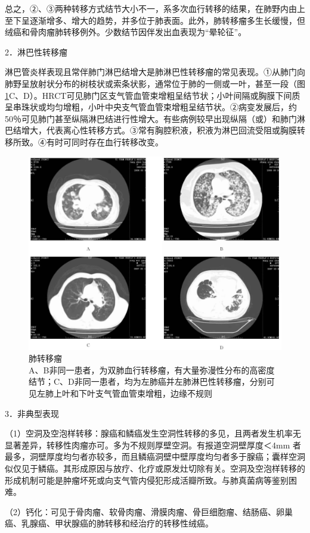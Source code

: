 总之，②、③两种转移方式结节大小不一，系多次血行转移的结果，在肺野内由上至下呈逐渐增多、增大的趋势，并多位于肺表面。此外，肺转移瘤多生长缓慢，但绒癌和骨肉瘤肺转移例外。少数结节因伴发出血表现为“晕轮征”。

2．淋巴性转移瘤

淋巴管炎样表现且常伴肺门淋巴结增大是肺淋巴性转移瘤的常见表现。①从肺门向肺野呈放射状分布的树枝状或索条状影，通常位于肺的一侧或一叶，甚至一段（图\ref{fig9-31}C、D）。HRCT可见肺门区支气管血管束增粗呈结节状；小叶间隔或胸膜下间质呈串珠状或均匀增粗，小叶中央支气管血管束增粗呈结节状。②病变发展后，约50％可见肺门甚至纵隔淋巴结进行性增大。有些病例较早出现纵隔（或）和肺门淋巴结增大，代表离心性转移方式。③常有胸腔积液，积液为淋巴回流受阻或胸膜转移所致。④有时可同时存在血行转移改变。

\begin{figure}[!htbp]
 \centering
 \includegraphics[width=.7\textwidth,height=\textheight,keepaspectratio]{./images/Image00222.jpg}
 \captionsetup{justification=centering}
 \caption{肺转移瘤\\{\small A、B非同一患者，为双肺血行转移瘤，有大量弥漫性分布的高密度结节；C、D非同一患者，均为左肺癌并左肺淋巴性转移瘤，分别可见左肺上叶和下叶支气管血管束增粗，边缘不规则}}
 \label{fig9-31}
  \end{figure} 

3．非典型表现

（1）空洞及空泡样转移：腺癌和鳞癌发生空洞性转移的多见，且两者发生机率无显著差异，转移性肉瘤亦可。多为不规则厚壁空洞。有报道空洞壁厚度＜4mm
者最多，洞壁厚度均匀者亦较多，而且鳞癌洞壁中壁厚度均匀者多于腺癌；囊样空洞似仅见于鳞癌。其形成原因与放疗、化疗或原发灶切除有关。空洞及空泡样转移的形成机制可能是肿瘤坏死或向支气管内侵犯形成活瓣所致。与肺真菌病等鉴别困难。

（2）钙化：可见于骨肉瘤、软骨肉瘤、滑膜肉瘤、骨巨细胞瘤、结肠癌、卵巢癌、乳腺癌、甲状腺癌的肺转移和经治疗的转移性绒癌。

